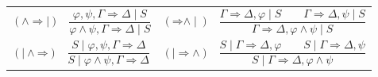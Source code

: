 \documentclass[11pt,a4paper,titlepage]{article}
\theoremstyle{definition}
\newcommand{\3}{\vspace{.3in}}
\newcommand{\2}{\vspace{.2in}}
\newcommand{\1}{\vspace{.1in}}
\newcommand{\5}{\vspace{.05in}}
\begin{document}
\noindent\begin{tabular}{ll}	
	$(\mathord{\wedge}\mathord{\Rightarrow\mid})$ \ $\dfrac{\varphi, \psi,
		\Gamma \Rightarrow \Delta \mid S}{\varphi\wedge\psi, \Gamma
		\Rightarrow \Delta \mid S}$ &
	 $(\mathord{\Rightarrow}\mathord{\wedge\mid})$ \ $\dfrac{\Gamma
		\Rightarrow \Delta, \varphi \mid S \qquad
		\Gamma\Rightarrow \Delta,
		\psi \mid S}{\Gamma \Rightarrow \Delta,
		\varphi\wedge\psi \mid S}$\\[16pt]
	
 $(\mathord{\mid\wedge}\mathord{\Rightarrow})$ \ $\dfrac{S \mid \varphi, \psi,
		\Gamma \Rightarrow \Delta}{S \mid \varphi\wedge\psi, \Gamma
		\Rightarrow \Delta}$ &
 $(\mathord{\mid\Rightarrow}\mathord{\wedge})$ \ $\dfrac{S\mid \Gamma
		\Rightarrow \Delta, \varphi \qquad
		S\mid \Gamma\Rightarrow \Delta,
		\psi}{S\mid\Gamma \Rightarrow \Delta,
		\varphi\wedge\psi }$\\[16pt]
\end{tabular}
\end{document}
